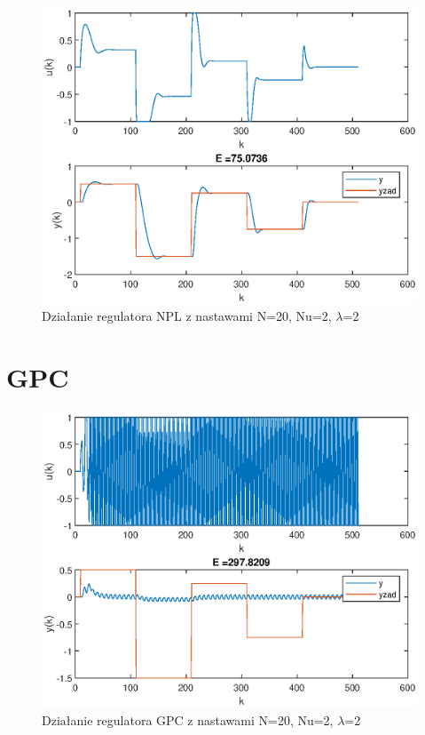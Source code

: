 		\begin{figure}[h!]
			\centering
			\includegraphics[width=\linewidth]{img/NPLlam2.eps}
			\caption{Działanie regulatora NPL z nastawami N=20, Nu=2, $\lambda$=2}
			\label{fig:NPL4}
		\end{figure}
		
		
	\section{GPC}
		\label{sec:GPC}
		
		\begin{figure}[h!]
			\centering
			\includegraphics[width=\linewidth]{img/GPC.eps}
			\caption{Działanie regulatora GPC z nastawami N=20, Nu=2, $\lambda$=2}
			\label{fig:GPC}
		\end{figure}
		
